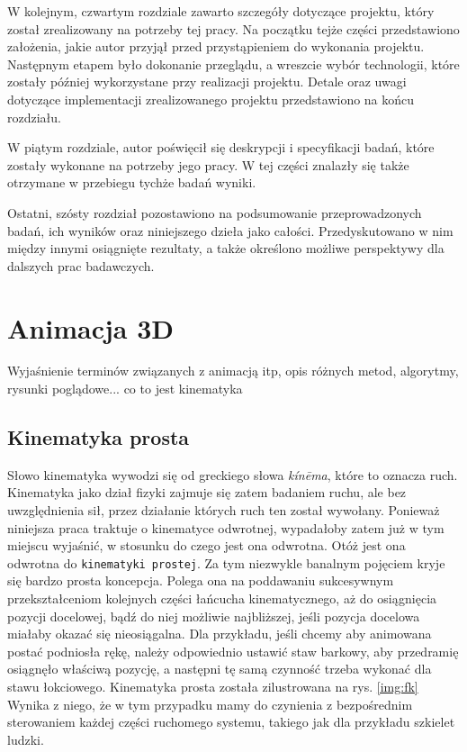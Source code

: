 \documentclass[11pt]{mwrep}
\begin{document}
  W kolejnym, czwartym rozdziale zawarto szczegóły dotyczące projektu, który został zrealizowany na potrzeby tej pracy. Na początku tejże części przedstawiono założenia, jakie autor przyjął przed przystąpieniem do wykonania projektu. Następnym etapem było dokonanie przeglądu, a wreszcie wybór technologii, które zostały później wykorzystane przy realizacji projektu. Detale oraz uwagi dotyczące implementacji zrealizowanego projektu przedstawiono na końcu rozdziału.

  W piątym rozdziale, autor poświęcił się deskrypcji i specyfikacji badań, które zostały wykonane na potrzeby jego pracy. W tej części znalazły się także otrzymane w przebiegu tychże badań wyniki.

  Ostatni, szósty rozdział pozostawiono na podsumowanie przeprowadzonych badań, ich wyników oraz niniejszego dzieła jako całości. Przedyskutowano w nim między innymi osiągnięte rezultaty, a także określono możliwe perspektywy dla dalszych prac badawczych.

\chapter{Animacja 3D}

Wyjaśnienie terminów związanych z animacją itp, opis różnych metod, algorytmy, rysunki poglądowe...
co to jest kinematyka

  \section{Kinematyka prosta}

  Słowo kinematyka wywodzi się od greckiego słowa \textit{kín\={e}ma}, które to oznacza ruch. Kinematyka jako dział fizyki zajmuje się zatem badaniem ruchu, ale bez uwzględnienia sił, przez działanie których ruch ten został wywołany. Ponieważ niniejsza praca traktuje o kinematyce odwrotnej, wypadałoby zatem już w tym miejscu wyjaśnić, w stosunku do czego jest ona odwrotna. Otóż jest ona odwrotna do \texttt{kinematyki prostej}. Za tym niezwykle banalnym pojęciem kryje się bardzo prosta koncepcja. Polega ona na poddawaniu sukcesywnym przekształceniom kolejnych części łańcucha kinematycznego, aż do osiągnięcia pozycji docelowej, bądź do niej możliwie najbliższej, jeśli pozycja docelowa miałaby okazać się nieosiągalna. Dla przykładu, jeśli chcemy aby animowana postać podniosła rękę, należy odpowiednio ustawić staw barkowy, aby przedramię osiągnęło właściwą pozycję, a następni tę samą czynność trzeba wykonać dla stawu łokciowego. Kinematyka prosta została zilustrowana na rys. \ref{img:fk} Wynika z niego, że w tym przypadku mamy do czynienia z bezpośrednim sterowaniem każdej części ruchomego systemu, takiego jak dla przykładu szkielet ludzki.
\end{document}

